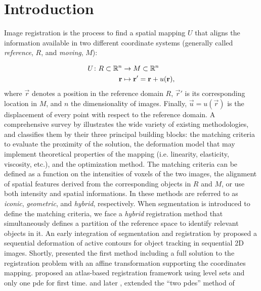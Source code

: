 \section{Introduction}\label{sec:introduction}
Image registration is the process to find a spatial mapping $U$ that aligns the information available
  in two different coordinate systems (generally called \emph{reference},
  $R$, and \emph{moving}, $M$):%

  \begin{align}
  U\colon R \subset \mathbb{R}^n &\to M \subset \mathbb{R}^n \notag\\
  \vec{r} &\mapsto \vec{r}' =\vec{r}+u(\vec{r}),
  \label{eq:transform}
  \end{align}
%
  where $\vec{r}$ denotes a position in the reference domain $R$, $\vec{r}'$ is
  its corresponding location in $M$, and $n$ the dimensionality of images.
Finally, $\vec{u} = u(\vec{r})$ is the displacement of every point with respect
  to the reference domain.
A comprehensive survey by \cite{sotiras_deformable_2013} illustrates the wide variety
  of existing methodologies, and classifies them by their three principal building blocks:
  the matching criteria to evaluate the proximity of the solution,
  the deformation model that may implement theoretical properties of the mapping
  (i.e. linearity, elasticity, viscosity, etc.), and the optimization method.
The matching criteria can be defined as a function on the intensities of voxels of the
  two images, the alignment of spatial features derived from the corresponding objects in
  $R$ and $M$, or use both intensity and spatial informations.
In \citep{sotiras_deformable_2013} these methods are referred to as \emph{iconic}, \emph{geometric},
  and \emph{hybrid}, respectively.
When segmentation is introduced to define the matching criteria, we face a \emph{hybrid}
  registration method that simultaneously defines a partition of the reference space to identify
  relevant objects in it.
An early integration of segmentation and registration by \cite{bertalmio_morphing_2000} proposed
  a sequential deformation of active contours for object tracking in sequential 2D images.
Shortly, \cite{yezzi_variational_2003} presented the first method including a full solution to
  the registration problem with an affine transformation supporting the coordinates mapping.
\cite{vemuri_joint_2003} proposed an atlas-based registration framework using level sets and only
  one \gls*{pde} for first time.
\cite{unal_coupled_2005} and later \cite{wang_joint_2006},
  extended the ``two \glspl*{pde}'' method of \cite{yezzi_variational_2001}
